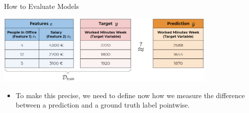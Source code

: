 \documentclass[11pt,compress,t,notes=noshow, xcolor=table]{beamer}
\begin{document}
\begin{vbframe}{How to Evaluate Models}
\begin{center}\includegraphics[width=0.8\textwidth]{figure_man/ml-basics-riskmin-eval.png} \end{center}
\begin{itemize}
    \item To make this precise, we need to define now how we measure the difference
        between a prediction and a ground truth label pointwise.
  \end{itemize}
  
\end{vbframe}
\end{document}
